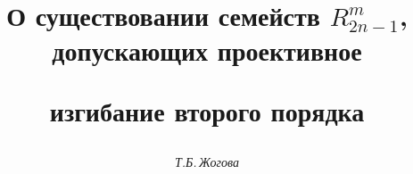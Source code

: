 

 


% 


 


\newcommand{\tts}[1]{} 


 




 


\setcounter{page}{31} 












 


\author{\it Т.Б.\,Жогова} 




\title{О существовании семейств $R^m_{2n-1}$, допускающих проективное 


изгибание второго порядка} 


 


\date{} 




\pagestyle{plain} %


 




\maketitle 


